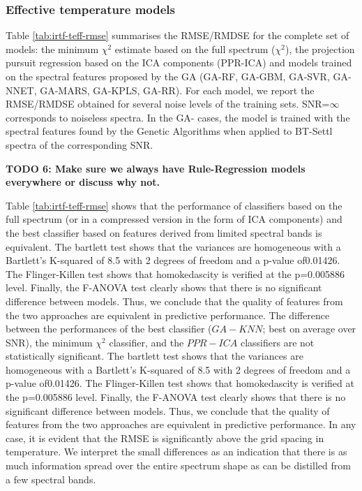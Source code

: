 
\subsubsection{Effective temperature models}
\label{sect:irtf-teff}

Table \ref{tab:irtf-teff-rmse} summarises the RMSE/RMDSE for the
complete set of models: the minimum $\chi^2$ estimate based on the
full spectrum ($\chi^2$), the projection pursuit regression based on
the ICA components (PPR-ICA) and models trained on the spectral
features proposed by the GA (GA-RF, GA-GBM, GA-SVR, GA-NNET, GA-MARS,
GA-KPLS, GA-RR). For each model, we report the RMSE/RMDSE obtained for
several noise levels of the training sets.  SNR=$\infty$ corresponds
to noiseless spectra. In the GA- cases, the model is trained with the
spectral features found by the Genetic Algorithms when applied to
BT-Settl spectra of the corresponding SNR.

{\bf TODO 6: Make sure we always have Rule-Regression models everywhere or
  discuss why not.}
  
Table \ref{tab:irtf-teff-rmse} shows that the performance of classifiers
based on the full spectrum (or in a compressed version in the form of
ICA components) and the best classifier based on features derived from
limited spectral bands is equivalent. The bartlett test shows that the
variances are homogeneous with a Bartlett\textquoteright s K-squared
of 8.5 with 2 degrees of freedom and a p-value of0.01426. The
Flinger-Killen test shows that homokedascity is verified at the
p=0.005886 level. Finally, the F-ANOVA test clearly shows that there
is no significant difference between models. Thus, we conclude that
the quality of features from the two approaches are equivalent in
predictive performance.  The difference between the performances of
the best classifier ($GA-KNN$; best on average over SNR), the minimum
$\chi^2$ classifier, and the $PPR-ICA$ classifiers are not
statistically significant. The bartlett test shows that the variances
are homogeneous with a Bartlett\textquoteright s K-squared of 8.5 with
2 degrees of freedom and a p-value of0.01426. The Flinger-Killen test
shows that homokedascity is verified at the p=0.005886 level. Finally,
the F-ANOVA test clearly shows that there is no significant difference
between models. Thus, we conclude that the quality of features from
the two approaches are equivalent in predictive performance.  In any
case, it is evident that the RMSE is significantly above the grid
spacing in temperature. We interpret the small differences as an
indication that there is as much information spread over the entire
spectrum shape as can be distilled from a few spectral bands.

